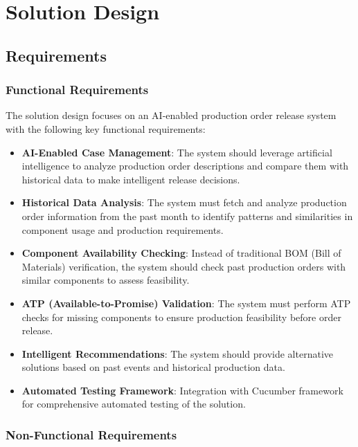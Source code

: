 \chapter{Solution Design}
\label{chap:SolutionDesign}

\section{Requirements}

\subsection{Functional Requirements}

The solution design focuses on an AI-enabled production order release system with the following key functional requirements:

\begin{itemize}
    \item \textbf{AI-Enabled Case Management}: The system should leverage artificial intelligence to analyze production order descriptions and compare them with historical data to make intelligent release decisions.
    
    \item \textbf{Historical Data Analysis}: The system must fetch and analyze production order information from the past month to identify patterns and similarities in component usage and production requirements.
    
    \item \textbf{Component Availability Checking}: Instead of traditional BOM (Bill of Materials) verification, the system should check past production orders with similar components to assess feasibility.
    
    \item \textbf{ATP (Available-to-Promise) Validation}: The system must perform ATP checks for missing components to ensure production feasibility before order release.
    
    \item \textbf{Intelligent Recommendations}: The system should provide alternative solutions based on past events and historical production data.
    
    \item \textbf{Automated Testing Framework}: Integration with Cucumber framework for comprehensive automated testing of the solution.
\end{itemize}

\subsection{Non-Functional Requirements}

